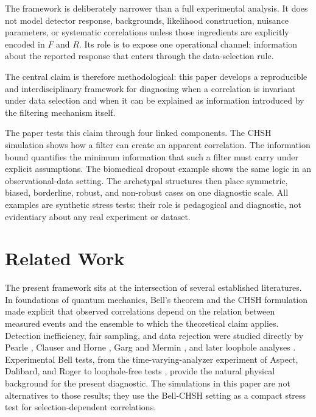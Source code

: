 \documentclass[11pt]{article}
\begin{document}
The framework is deliberately narrower than a full experimental analysis. It does not model detector response, backgrounds, likelihood construction, nuisance parameters, or systematic correlations unless those ingredients are explicitly encoded in \(F\) and \(R\). Its role is to expose one operational channel: information about the reported response that enters through the data-selection rule.

The central claim is therefore methodological: this paper develops a reproducible and interdisciplinary framework for diagnosing when a correlation is invariant under data selection and when it can be explained as information introduced by the filtering mechanism itself.

The paper tests this claim through four linked components. The CHSH simulation shows how a filter can create an apparent correlation. The information bound quantifies the minimum information that such a filter must carry under explicit assumptions. The biomedical dropout example shows the same logic in an observational-data setting. The archetypal structures then place symmetric, biased, borderline, robust, and non-robust cases on one diagnostic scale. All examples are synthetic stress tests: their role is pedagogical and diagnostic, not evidentiary about any real experiment or dataset.

\section{Related Work}

The present framework sits at the intersection of several established literatures. In foundations of quantum mechanics, Bell's theorem \cite{Bell1964} and the CHSH formulation \cite{CHSH1969} made explicit that observed correlations depend on the relation between measured events and the ensemble to which the theoretical claim applies. Detection inefficiency, fair sampling, and data rejection were studied directly by Pearle \cite{Pearle1970}, Clauser and Horne \cite{ClauserHorne1974}, Garg and Mermin \cite{GargMermin1987}, and later loophole analyses \cite{Larsson2014}. Experimental Bell tests, from the time-varying-analyzer experiment of Aspect, Dalibard, and Roger \cite{Aspect1982} to loophole-free tests \cite{Hensen2015,Giustina2015,Shalm2015}, provide the natural physical background for the present diagnostic. The simulations in this paper are not alternatives to those results; they use the Bell-CHSH setting as a compact stress test for selection-dependent correlations.
\end{document}
